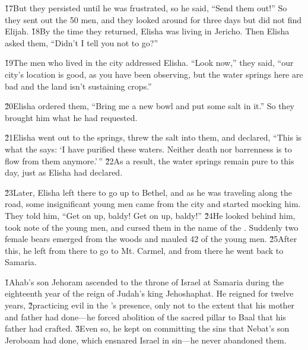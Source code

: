 \v{17}But they persisted until he was frustrated, so he said, ``Send them out!'' So they sent out the 50 men, and they looked around for three days but did not find Elijah. \v{18}By the time they returned, Elisha was living in Jericho. Then Elisha asked them, ``Didn't I tell you not to go?''

\v{19}The men who lived in the city addressed Elisha. ``Look now,'' they said, ``our city's location is good, as you have been observing, but the water springs here are bad and the land isn't sustaining crops.''

\v{20}Elisha ordered them, ``Bring me a new bowl and put some salt in it.'' So they brought him what he had requested.

\v{21}Elisha went out to the springs, threw the salt into them, and declared, ``This is what the  says: `I have purified these waters. Neither death nor barrenness is to flow from them anymore.'\,'' \v{22}As a result, the water springs remain pure to this day, just as Elisha had declared.

\v{23}Later, Elisha left there to go up to Bethel, and as he was traveling along the road, some insignificant young men came from the city and started mocking him. They told him, ``Get on up, baldy! Get on up, baldy!'' \v{24}He looked behind him, took note of the young men, and cursed them in the name of the . Suddenly two female bears emerged from the woods and mauled 42 of the young men. \v{25}After this, he left from there to go to Mt. Carmel, and from there he went back to Samaria.

\v{1}Ahab's son Jehoram ascended to the throne of Israel at Samaria during the eighteenth year of the reign of Judah's king Jehoshaphat. He reigned for twelve years, \v{2}practicing evil in the 's presence, only not to the extent that his mother and father had done---he forced abolition of the sacred pillar to Baal that his father had crafted. \v{3}Even so, he kept on committing the sins that Nebat's son Jeroboam had done, which ensnared Israel in sin---he never abandoned them.

